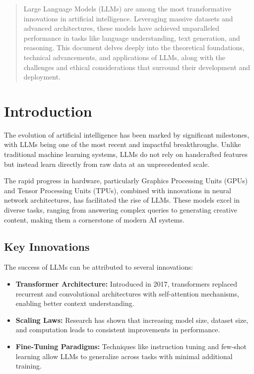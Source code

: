 

\maketitle

\begin{abstract}
Large Language Models (LLMs) are among the most transformative innovations in artificial intelligence. Leveraging massive datasets and advanced architectures, these models have achieved unparalleled performance in tasks like language understanding, text generation, and reasoning. This document delves deeply into the theoretical foundations, technical advancements, and applications of LLMs, along with the challenges and ethical considerations that surround their development and deployment.
\end{abstract}

\section{Introduction}
The evolution of artificial intelligence has been marked by significant milestones, with LLMs being one of the most recent and impactful breakthroughs. Unlike traditional machine learning systems, LLMs do not rely on handcrafted features but instead learn directly from raw data at an unprecedented scale.

The rapid progress in hardware, particularly Graphics Processing Units (GPUs) and Tensor Processing Units (TPUs), combined with innovations in neural network architectures, has facilitated the rise of LLMs. These models excel in diverse tasks, ranging from answering complex queries to generating creative content, making them a cornerstone of modern AI systems.

\subsection{Key Innovations}
The success of LLMs can be attributed to several innovations:
\begin{itemize}
    \item \textbf{Transformer Architecture:} Introduced in 2017, transformers replaced recurrent and convolutional architectures with self-attention mechanisms, enabling better context understanding.
    \item \textbf{Scaling Laws:} Research has shown that increasing model size, dataset size, and computation leads to consistent improvements in performance.
    \item \textbf{Fine-Tuning Paradigms:} Techniques like instruction tuning and few-shot learning allow LLMs to generalize across tasks with minimal additional training.
\end{itemize}

